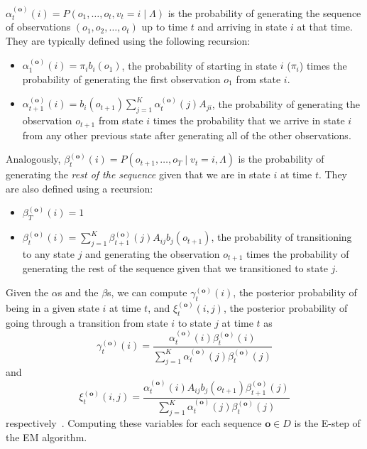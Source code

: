 $\alpha^{(\mathbf{o})}_t(i) = P(o_1, \ldots, o_t, v_t = i \mid \Lambda)$ is
the probability of generating the sequence of observations $(o_1, o_2,
\ldots, o_t)$ up to time $t$ and arriving in state $i$ at that time. They
are typically defined using the following recursion:
\begin{itemize}
  \item $\alpha^{(\mathbf{o})}_1(i) = \pi_i b_i(o_1)$, the probability of starting in
    state $i$ ($\pi_i$) times the probability of generating the first
    observation $o_1$ from state $i$.
  \item $\alpha^{(\mathbf{o})}_{t+1}(i) = b_i(o_{t+1})\sum_{j=1}^K
    \alpha^{(\mathbf{o})}_t(j) A_{ji}$, the probability of generating the observation
    $o_{t+1}$ from state $i$ times the probability that we arrive in state
    $i$ from any other previous state after generating all of the other
    observations.
\end{itemize}

Analogously, $\beta^{(\mathbf{o})}_t(i) = P(o_{t+1}, \ldots, o_{T} \mid v_t
= i, \Lambda)$ is the probability of generating the \emph{rest of the
sequence} given that we are in state $i$ at time $t$. They are also defined
using a recursion:
\begin{itemize}
  \item $\beta^{(\mathbf{o})}_T(i) = 1$
  \item $\beta^{(\mathbf{o})}_t(i) = \sum_{j=1}^K
    \beta^{(\mathbf{o})}_{t+1}(j) A_{ij} b_j(o_{t+1})$, the probability of
    transitioning to any state $j$ and generating the observation $o_{t+1}$
    times the probability of generating the rest of the sequence given that
    we transitioned to state $j$.
\end{itemize}

Given the $\alpha$s and the $\beta$s, we can compute
$\gamma^{(\mathbf{o})}_t(i)$, the posterior probability of being in a given
state $i$ at time $t$, and $\xi^{(\mathbf{o})}_t(i,j)$, the posterior
probability of going through a transition from state $i$ to state $j$ at
time $t$ as
\begin{equation}
  \gamma^{(\mathbf{o})}_t(i) =
  \frac{\alpha^{(\mathbf{o})}_t(i)\beta^{(\mathbf{o})}_t(i)}{\sum_{j=1}^K
  \alpha^{(\mathbf{o})}_t(j)\beta^{(\mathbf{o})}_t(j)}
\end{equation}
and
\begin{equation}
  \xi^{(\mathbf{o})}_t(i,j) = \frac{\alpha^{(\mathbf{o})}_t(i) A_{ij}
  b_j(o_{t+1}) \beta^{(\mathbf{o})}_{t+1}(j)} {\sum_{j=1}^K
  \alpha^{(\mathbf{o})}_t(j)\beta^{(\mathbf{o})}_t(j)}
\end{equation}
respectively~\cite{Rabiner:1990:RSR}. Computing these variables for each
sequence $\mathbf{o} \in D$ is the E-step of the EM algorithm.

